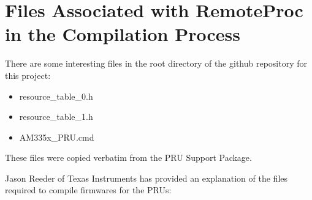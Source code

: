 \section{Files Associated with RemoteProc in the Compilation Process}

There are some interesting files in the root directory of the github repository for this project:

\begin{itemize}
\item resource\_table\_0.h
\item resource\_table\_1.h
\item AM335x\_PRU.cmd
\end{itemize}

These files were copied verbatim from the PRU Support Package.

Jason Reeder of Texas Instruments has provided an explanation of the files required to compile firmwares for the PRUs:

